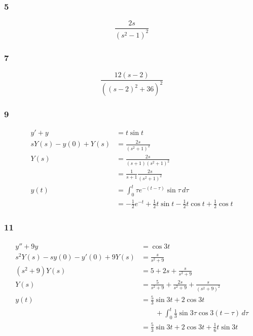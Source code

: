 \documentclass{article}
\begin{document}
\subsubsection{5}

\[\frac{2 s}{(s^2 - 1)^2}\]

\subsubsection{7}

\[\frac{12 (s - 2)}{((s - 2)^2 + 36)^2}\]

\subsubsection{9}

\begin{align*}
  y' + y               & = t \sin t                                                                               \\
  s Y(s) - y(0) + Y(s) & = \frac{2 s}{(s^2 + 1)^2}                                                                \\
  Y(s)                 & = \frac{2 s}{(s + 1) (s^2 + 1)^2}                                                        \\
                       & = \frac{1}{s + 1} \frac{2 s}{(s^2 + 1)^2}                                                \\
  y(t)                 & = \int_0^t \tau e^{-(t - \tau)} \sin \tau \,d\tau                                        \\
                       & = -\frac{1}{2} e^{-t} + \frac{1}{2} t \sin t - \frac{1}{2} t \cos t + \frac{1}{2} \cos t
\end{align*}

\subsubsection{11}

\begin{align*}
  y'' + 9 y                          & = \cos 3 t                                                          \\
  s^2 Y(s) - s y(0) - y'(0) + 9 Y(s) & = \frac{s}{s^2 + 9}                                                 \\
  (s^2 + 9) Y(s)                     & = 5 + 2 s + \frac{s}{s^2 + 9}                                       \\
  Y(s)                               & = \frac{5}{s^2 + 9} + \frac{2 s}{s^2 + 9} + \frac{s}{(s^2 + 9)^2}   \\
  y(t)                               & = \frac{5}{3} \sin 3 t + 2 \cos 3 t                                 \\
                                     & \qquad + \int_0^t \frac{1}{3} \sin 3 \tau \cos 3 (t - \tau) \,d\tau \\
                                     & = \frac{5}{3} \sin 3 t + 2 \cos 3 t + \frac{1}{6} t \sin 3 t
\end{align*}
\end{document}
